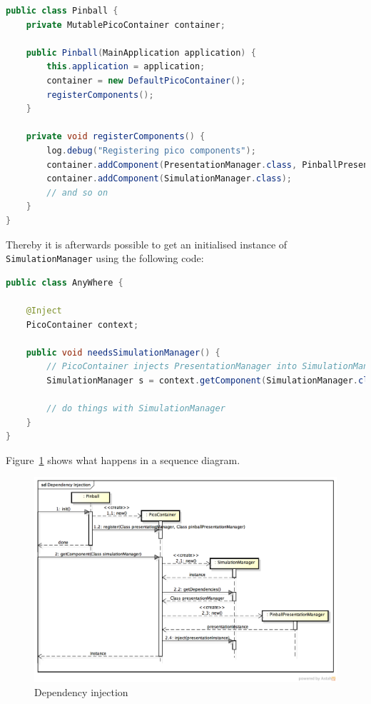 \documentclass[fontsize=12pt,
               paper=a4,
               twoside=false,
               parskip=half,
               ]{scrartcl}
\begin{document}
\begin{lstlisting}[language=Java,label=lst:dependency_injection,caption={dependency injection}]
public class Pinball {
	private MutablePicoContainer container;

	public Pinball(MainApplication application) {
		this.application = application;
		container = new DefaultPicoContainer();
		registerComponents();
	}

	private void registerComponents() {
		log.debug("Registering pico components");
		container.addComponent(PresentationManager.class, PinballPresentationManager.class);
		container.addComponent(SimulationManager.class);
		// and so on
	}
}
\end{lstlisting}

Thereby it is afterwards possible to get an initialised instance of \texttt{SimulationManager} using the following code:

\begin{lstlisting}[language=Java,label=lst:get_initialised_component,caption={get initialised component}]
public class AnyWhere {
	
	@Inject
	PicoContainer context;

	public void needsSimulationManager() {
		// PicoContainer injects PresentationManager into SimulationManager
		SimulationManager s = context.getComponent(SimulationManager.class);

		// do things with SimulationManager
	}
}
\end{lstlisting}

Figure~\ref{fig:dependency_injection3} shows what happens in a sequence diagram.

\begin{figure}[H]
	\centering
	\includegraphics[width=15.5cm]{./img/dependency-injection-sd.png}
	\caption[Dependency injection]{Dependency injection}
	\label{fig:dependency_injection3}
\end{figure}
\end{document}
